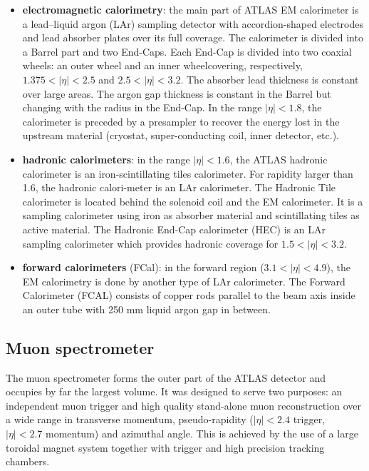 \documentclass[a4paper, oneside]{book}
\begin{document}
					\begin{itemize}
						\item \textbf{electromagnetic calorimetry}:
						the main part of ATLAS EM calorimeter is a lead–liquid argon (LAr) sampling detector with accordion-shaped electrodes and lead absorber plates over its full coverage. The calorimeter is divided into a Barrel part and two End-Caps. Each End-Cap is divided into two coaxial wheels: an outer wheel and an inner wheelcovering, respectively, $1.375<|\eta|<2.5$ and $2.5<|\eta|<3.2$. The absorber lead thickness is constant over large areas. The argon gap thickness is constant in the Barrel but changing with the radius in the End-Cap.
						In the range $|\eta|<1.8$, the calorimeter is preceded by a presampler to recover the energy lost in the upstream material (cryostat, super-conducting coil, inner detector, etc.).
						\item \textbf{hadronic calorimeters}:
						in the range $|\eta|<1.6$, the ATLAS hadronic calorimeter is an iron-scintillating tiles calorimeter. For rapidity larger than 1.6, the hadronic calori-meter is an LAr calorimeter. The Hadronic Tile calorimeter is located behind the solenoid coil and the EM calorimeter. It is a sampling calorimeter using iron as absorber material and scintillating tiles as active material. The Hadronic End-Cap calorimeter (HEC) is an LAr sampling calorimeter which provides hadronic coverage for $1.5<|\eta|<3.2$.
						\item \textbf{forward calorimeters} (FCal):
						in the forward region ($3.1<|\eta|<4.9$), the EM calorimetry is done by another type of LAr calorimeter. The Forward Calorimeter (FCAL) consists of copper rods parallel to the beam axis inside an outer tube with 250 mm liquid argon gap in between.
					\end{itemize}
		
		
				\subsection{Muon spectrometer}
					\cite{Muon system}The  muon  spectrometer  forms  the  outer  part  of  the  ATLAS  detector  and occupies by far the largest volume. It was designed to serve two purposes: an independent muon trigger and high quality stand-alone muon reconstruction over a wide range in transverse momentum, pseudo-rapidity ($|\eta|<2.4$ trigger, $|\eta|<2.7$ momentum) and azimuthal angle. This is achieved by the use of a large toroidal magnet system together with trigger and high precision tracking chambers.
					
\end{document}
